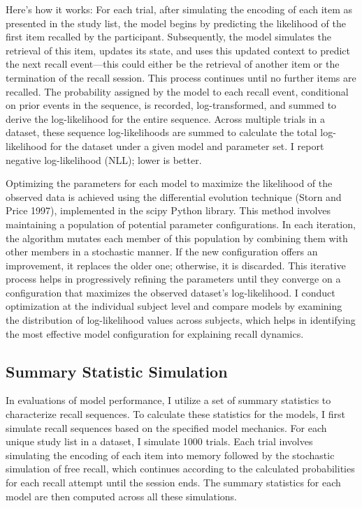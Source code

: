 \documentclass[
  letterpaper,
  11pt,
  english,
  singlespacing,
  headsepline]{MastersDoctoralThesis}
\begin{document}
Here's how it works: For each trial, after simulating the encoding of
each item as presented in the study list, the model begins by predicting
the likelihood of the first item recalled by the participant.
Subsequently, the model simulates the retrieval of this item, updates
its state, and uses this updated context to predict the next recall
event---this could either be the retrieval of another item or the
termination of the recall session. This process continues until no
further items are recalled. The probability assigned by the model to
each recall event, conditional on prior events in the sequence, is
recorded, log-transformed, and summed to derive the log-likelihood for
the entire sequence. Across multiple trials in a dataset, these sequence
log-likelihoods are summed to calculate the total log-likelihood for the
dataset under a given model and parameter set. I report negative
log-likelihood (NLL); lower is better.

Optimizing the parameters for each model to maximize the likelihood of
the observed data is achieved using the differential evolution technique
(Storn and Price 1997), implemented in the scipy Python library. This
method involves maintaining a population of potential parameter
configurations. In each iteration, the algorithm mutates each member of
this population by combining them with other members in a stochastic
manner. If the new configuration offers an improvement, it replaces the
older one; otherwise, it is discarded. This iterative process helps in
progressively refining the parameters until they converge on a
configuration that maximizes the observed dataset's log-likelihood. I
conduct optimization at the individual subject level and compare models
by examining the distribution of log-likelihood values across subjects,
which helps in identifying the most effective model configuration for
explaining recall dynamics.

\subsection{Summary Statistic
Simulation}\label{summary-statistic-simulation}

In evaluations of model performance, I utilize a set of summary
statistics to characterize recall sequences. To calculate these
statistics for the models, I first simulate recall sequences based on
the specified model mechanics. For each unique study list in a dataset,
I simulate 1000 trials. Each trial involves simulating the encoding of
each item into memory followed by the stochastic simulation of free
recall, which continues according to the calculated probabilities for
each recall attempt until the session ends. The summary statistics for
each model are then computed across all these simulations.
\end{document}

